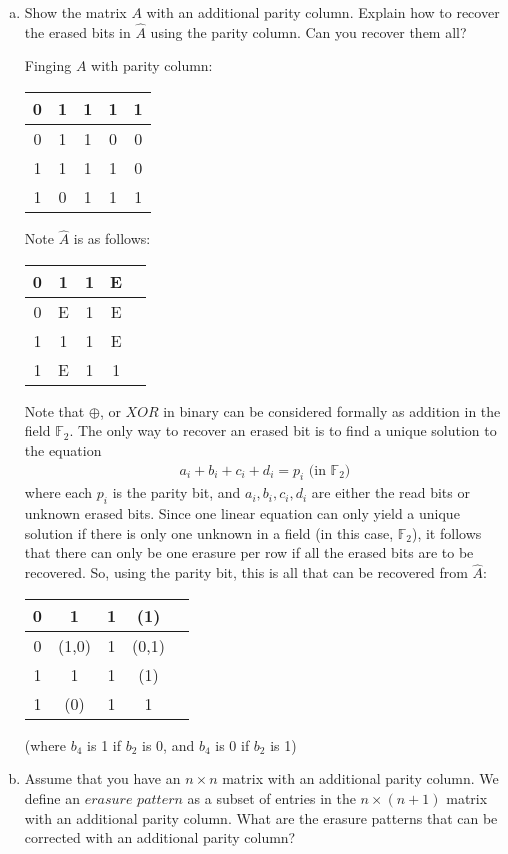 \documentclass{article}
\begin{document}
\begin{enumerate}[(a)]
  \item
    Show the matrix $A$ with an additional parity column. Explain how to
    recover the erased bits in $\hat{A}$ using the parity column. Can you
    recover them all?

    \vspace{5mm}
    Finging $A$ with parity column:
    \begin{tabular}{| c | c | c | c | c |}
      \hline
      0 & 1 & 1 & 1 & 1 \\
      \hline
      0 & 1 & 1 & 0 & 0 \\
      \hline
      1 & 1 & 1 & 1 & 0 \\
      \hline
      1 & 0 & 1 & 1 & 1 \\
      \hline
    \end{tabular}
    Note $\hat{A}$ is as follows:
    \begin{tabular}{| c | c | c | c | c |}
      \hline
      0 & 1 & 1 & E \\
      \hline
      0 & E & 1 & E \\
      \hline
      1 & 1 & 1 & E \\
      \hline
      1 & E & 1 & 1 \\
      \hline
    \end{tabular}

    Note that $\oplus$, or $XOR$ in binary can be considered formally as
    addition in the field $\mathbb{F}_2$. The only way to recover an erased
    bit is to find a unique solution to the equation
    \begin{align*}
      a_i + b_i + c_i + d_i = p_i \text{ (in $\mathbb{F}_2$)}
    \end{align*}
    where each $p_i$ is the parity bit, and $a_i,b_i,c_i,d_i$ are either the
    read bits or unknown erased bits. Since one linear equation can only yield
    a unique solution if there is only one unknown in a field (in this case,
    $\mathbb{F}_2$), it follows that there can only be one erasure per row if
    all the erased bits are to be recovered. So, using the parity bit, this is
    all that can be recovered from $\hat{A}$:

    \vspace{5mm}

    \begin{tabular}{| c | c | c | c | c |}
      \hline
      0 & 1 & 1 & (1) \\
      \hline
      0 & (1,0) & 1 & (0,1) \\
      \hline
      1 & 1 & 1 & (1) \\
      \hline
      1 & (0) & 1 & 1 \\
      \hline
    \end{tabular}
    (where $b_4$ is 1 if $b_2$ is 0, and $b_4$ is 0 if $b_2$ is 1)
  \item
    Assume that you have an $n \times n$ matrix with an additional parity
    column. We define an $erasure$ $pattern$ as a subset of entries in the
    $n \times (n+1)$ matrix with an additional parity column. What are the
    erasure patterns that can be corrected with an additional parity column?


\end{enumerate}
\end{document}
